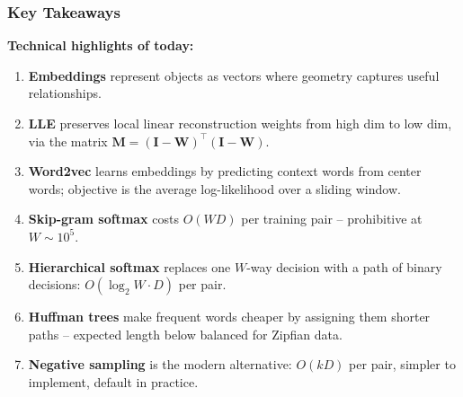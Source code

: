 \documentclass[notes,11pt, aspectratio=169]{beamer}
\newcommand{\vM}{\mathbf{M}}
\newcommand{\vW}{\mathbf{W}}
\begin{document}
\begin{frame}
\frametitle{Key Takeaways}

\textbf{Technical highlights of today:}

\vspace{6pt}
\begin{enumerate}
    \item \textbf{Embeddings} represent objects as vectors where geometry captures useful relationships.

    \vspace{4pt}
    \item \textbf{LLE} preserves local linear reconstruction weights from high dim to low dim, via the matrix $\vM = (\mathbf{I} - \vW)^\top (\mathbf{I} - \vW)$.

    \vspace{4pt}
    \item \textbf{Word2vec} learns embeddings by predicting context words from center words; objective is the average log-likelihood over a sliding window.

    \vspace{4pt}
    \item \textbf{Skip-gram softmax} costs $O(W D)$ per training pair -- prohibitive at $W \sim 10^5$.

    \vspace{4pt}
    \item \textbf{Hierarchical softmax} replaces one $W$-way decision with a path of binary decisions: $O(\log_2 W \cdot D)$ per pair.

    \vspace{4pt}
    \item \textbf{Huffman trees} make frequent words cheaper by assigning them shorter paths -- expected length below balanced for Zipfian data.

    \vspace{4pt}
    \item \textbf{Negative sampling} is the modern alternative: $O(k D)$ per pair, simpler to implement, default in practice.
\end{enumerate}
\end{frame}
\end{document}

